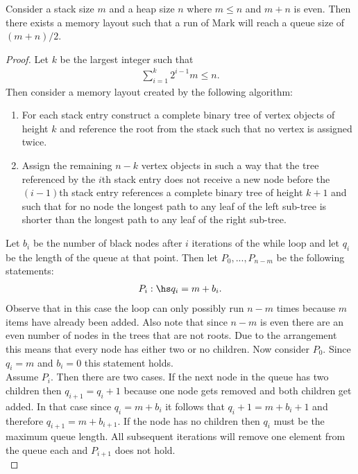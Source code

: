 \documentclass{article}
\begin{document}
\begin{claim}
	Consider a stack size $m$ and a heap size $n$ where $m\leq n$ and
	$m+n$ is even. Then there exists a memory layout such that a run of Mark
	will reach a queue size of $(m+n)/2$.
\end{claim}

\begin{proof}
	Let $k$ be the largest integer such that
	\begin{align*}
		\sum_{i=1}^k 2^{i-1}m \leq n.
	\end{align*}
	Then consider a memory layout created by the following algorithm:
	\begin{enumerate}
		\item For each stack entry construct a complete binary tree of vertex objects
		      of height $k$ and reference the root from the stack such that no vertex is assigned twice.
		\item Assign the remaining $n-k$ vertex objects in such a way that the tree referenced by the $i$th
		      stack entry does not receive a new node before the $(i-1)$th stack entry references a
		      complete binary tree of height $k+1$
		      and such that for no node the longest path to any leaf of the left sub-tree is shorter
		      than the longest path to any leaf of the right sub-tree.
	\end{enumerate}
	Let $b_i$ be the number of black nodes after $i$ iterations of the while loop and let
	$q_i$ be the length of the queue at that point. Then let $P_0,...,P_{n-m}$ be the
	following statements:
	\begin{align*}
		P_i:\hs q_i = m+b_i.
	\end{align*}
	Observe that in this case the loop can only possibly run $n-m$ times because $m$ items have
	already been added. Also note that since $n-m$ is even there are an even number of nodes
	in the trees that are not roots. Due to the arrangement this means that every node has either
	two or no children. Now consider $P_0$. Since $q_i=m$ and $b_i=0$ this statement holds.\\
	\indent Assume $P_i$. Then there are two cases. If the next node in the queue has two children
	then $q_{i+1} = q_i+1$ because one node gets removed and both children get added. In that
	case since $q_i = m + b_i$ it follows that $q_i + 1 = m + b_i + 1$ and therefore
	$q_{i+1} = m + b_{i+1}$. If the
	node has no children then $q_i$ must be the maximum queue length. All subsequent iterations
	will remove one element from the queue each and $P_{i+1}$ does not hold.\\

\end{proof}
\end{document}

